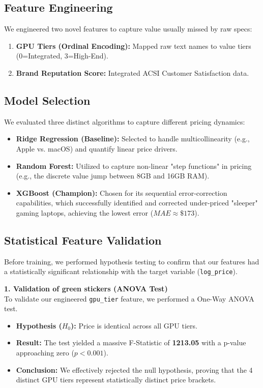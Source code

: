 \documentclass[11pt, a4paper]{article}
\begin{document}
\subsection{Feature Engineering}
We engineered two novel features to capture value usually missed by raw specs:
\begin{enumerate}
    \item \textbf{GPU Tiers (Ordinal Encoding):} Mapped raw text names to value tiers (0=Integrated, 3=High-End).
    \item \textbf{Brand Reputation Score:} Integrated ACSI Customer Satisfaction data.
\end{enumerate}

\subsection{Model Selection}
We evaluated three distinct algorithms to capture different pricing dynamics:
\begin{itemize}
\item \textbf{Ridge Regression (Baseline):} Selected to handle multicollinearity (e.g., Apple vs. macOS) and quantify linear price drivers.
\item \textbf{Random Forest:} Utilized to capture non-linear "step functions" in pricing (e.g., the discrete value jump between 8GB and 16GB RAM).
\item \textbf{XGBoost (Champion):} Chosen for its sequential error-correction capabilities, which successfully identified and corrected under-priced "sleeper" gaming laptops, achieving the lowest error ($MAE \approx \$173$).
\end{itemize}

\subsection{Statistical Feature Validation}
Before training, we performed hypothesis testing to confirm that our features had a statistically significant relationship with the target variable (\texttt{log\_price}).

\vspace{0.3cm}
\textbf{1. Validation of green stickers (ANOVA Test)} \\
To validate our engineered \texttt{gpu\_tier} feature, we performed a One-Way ANOVA test.
\begin{itemize}
    \item \textbf{Hypothesis ($H_0$):} Price is identical across all GPU tiers.
    \item \textbf{Result:} The test yielded a massive F-Statistic of \textbf{1213.05} with a p-value approaching zero ($p < 0.001$).
    \item \textbf{Conclusion:} We effectively rejected the null hypothesis, proving that the 4 distinct GPU tiers represent statistically distinct price brackets.
\end{itemize}
\end{document}
